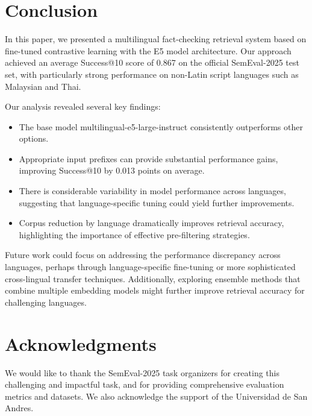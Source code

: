 \documentclass[11pt]{article}
\begin{document}
\section{Conclusion}

In this paper, we presented a multilingual fact-checking retrieval system based on fine-tuned contrastive learning with the E5 model architecture. Our approach achieved an average Success@10 score of 0.867 on the official SemEval-2025 test set, with particularly strong performance on non-Latin script languages such as Malaysian and Thai.

Our analysis revealed several key findings:

\begin{itemize}
    \item The base model multilingual-e5-large-instruct consistently outperforms other options.
    \item Appropriate input prefixes can provide substantial performance gains, improving Success@10 by 0.013 points on average.
    \item There is considerable variability in model performance across languages, suggesting that language-specific tuning could yield further improvements.
    \item Corpus reduction by language dramatically improves retrieval accuracy, highlighting the importance of effective pre-filtering strategies.
\end{itemize}

Future work could focus on addressing the performance discrepancy across languages, perhaps through language-specific fine-tuning or more sophisticated cross-lingual transfer techniques. Additionally, exploring ensemble methods that combine multiple embedding models might further improve retrieval accuracy for challenging languages.

\section{Acknowledgments}

We would like to thank the SemEval-2025 task organizers for creating this challenging and impactful task, and for providing comprehensive evaluation metrics and datasets. We also acknowledge the support of the Universidad de San Andres.

%

\end{document}
